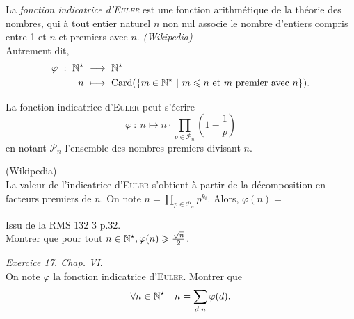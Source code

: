 \begin{defi}
    La \emph{fonction indicatrice d'\textsc{Euler}} est une fonction arithmétique de la théorie des nombres, qui à tout entier naturel $n$ non nul associe le nombre d'entiers compris entre 1 et $n$ et premiers avec $n$. \emph{(Wikipedia)} \\
    Autrement dit, 
    \begin{alignat*}{2}
        \varphi\ :\ \mathbb{N}^\star\ &\longrightarrow\ \mathbb{N}^\star\\
        n\ &\longmapsto\ \mathrm{Card}(\{m \in \mathbb{N}^\star\ |\ m \leqslant n \text{ et } m \text{ premier avec } n \}).
    \end{alignat*}
\end{defi}


\begin{tcolorbox}
    La fonction indicatrice d'\textsc{Euler} peut s'écrire
    $$\varphi\ :\ n \longmapsto n \cdot \prod_{p \in \mathscr{P}_n} \left(1 - \frac{1}{p} \right)$$
    en notant $\mathscr{P}_n$ l'ensemble des nombres premiers divisant $n$.
\end{tcolorbox}

\begin{preuve}
    (Wikipedia) \\
    La valeur de l'indicatrice d'\textsc{Euler} s'obtient à partir de la décomposition en facteurs premiers de $n$. On note $n = \prod\limits_{p \in \mathscr{P}_n} p^{k_i}$. Alors, $\varphi(n) = $
\end{preuve}

\begin{exercice}
    Issu de la RMS 132 3 p.32. \\
    Montrer que pour tout $n \in \mathbb{N}^\star, \varphi(n) \geqslant \frac{\sqrt{n}}{2}$.
\end{exercice}

\begin{exercice}
\emph{Exercice 17. Chap. VI}. \\
    On note $\varphi$ la fonction indicatrice d'\textsc{Euler}. Montrer que 
    $$\forall n \in \mathbb{N}^\star \quad n = \sum_{d|n} \varphi(d).$$
\end{exercice}

